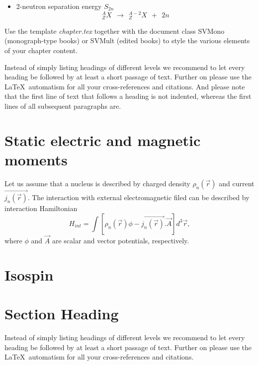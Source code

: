 \documentclass[graybox]{svmult}
\begin{document}
{\begin{itemize}
    \item 2-neutron separation energy $S_{2n}$
       \begin{equation*}
    ^{A}_ZX ~~\rightarrow~~  ^{A-2}_{Z}X  ~~+~~ 2n
    \end{equation*}
\end{itemize}

Use the template \emph{chapter.tex} together with the document class SVMono (monograph-type books) or SVMult (edited books) to style the various elements of your chapter content.

Instead of simply listing headings of different levels we recommend to let every heading be followed by at least a short passage of text.  Further on please use the \LaTeX\ automatism for all your cross-references and citations. And please note that the first line of text that follows a heading is not indented, whereas the first lines of all subsequent paragraphs are.

\section{Static electric and magnetic moments}
Let us assume that a nucleus is described by charged density $\rho_n(\Vec{r})$ and current $\Vec{j_n(\Vec{r})}$. The interaction with external electromagnetic filed can be described by interaction Hamiltonian
\begin{equation}
    H_{int}=\int{[\rho_n(\Vec{r})\phi - \Vec{j_n(\Vec{r})} . \Vec{A}]} d^3\Vec{r}, 
\end{equation}
where $\phi$ and $\Vec{A}$ are scalar and vector potentials, respectively.

\section{Isospin}

\section{Section Heading}
\label{sec:2}
Instead of simply listing headings of different levels we recommend to let every heading be followed by at least a short passage of text.  Further on please use the \LaTeX\ automatism for all your cross-references and citations.

}
\end{document}
